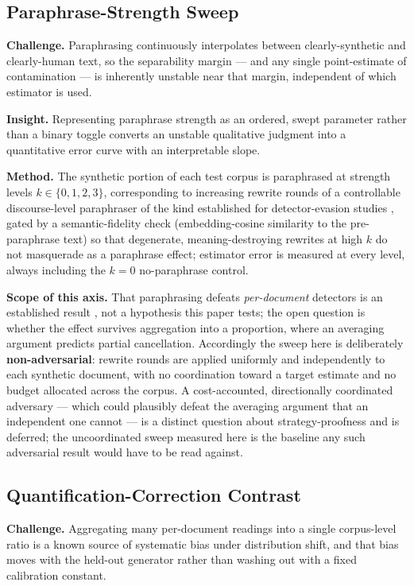\documentclass[11pt]{article}
\begin{document}
\subsection{Paraphrase-Strength Sweep}
\textbf{Challenge.} Paraphrasing continuously interpolates between clearly-synthetic and clearly-human text, so the separability margin --- and any single point-estimate of contamination --- is inherently unstable near that margin, independent of which estimator is used.

\textbf{Insight.} Representing paraphrase strength as an ordered, swept parameter rather than a binary toggle converts an unstable qualitative judgment into a quantitative error curve with an interpretable slope.

\textbf{Method.} The synthetic portion of each test corpus is paraphrased at strength levels $k \in \{0,1,2,3\}$, corresponding to increasing rewrite rounds of a controllable discourse-level paraphraser of the kind established for detector-evasion studies \citep{DipperParaphrase2023}, gated by a semantic-fidelity check (embedding-cosine similarity to the pre-paraphrase text) so that degenerate, meaning-destroying rewrites at high $k$ do not masquerade as a paraphrase effect; estimator error is measured at every level, always including the $k=0$ no-paraphrase control.

\textbf{Scope of this axis.} That paraphrasing defeats \emph{per-document} detectors is an established result \citep{DipperParaphrase2023,ReliablyDetectable2023}, not a hypothesis this paper tests; the open question is whether the effect survives aggregation into a proportion, where an averaging argument predicts partial cancellation. Accordingly the sweep here is deliberately \textbf{non-adversarial}: rewrite rounds are applied uniformly and independently to each synthetic document, with no coordination toward a target estimate and no budget allocated across the corpus. A cost-accounted, directionally coordinated adversary --- which could plausibly defeat the averaging argument that an independent one cannot --- is a distinct question about strategy-proofness and is deferred; the uncoordinated sweep measured here is the baseline any such adversarial result would have to be read against.

\subsection{Quantification-Correction Contrast}
\textbf{Challenge.} Aggregating many per-document readings into a single corpus-level ratio is a known source of systematic bias under distribution shift, and that bias moves with the held-out generator rather than washing out with a fixed calibration constant.
\end{document}
